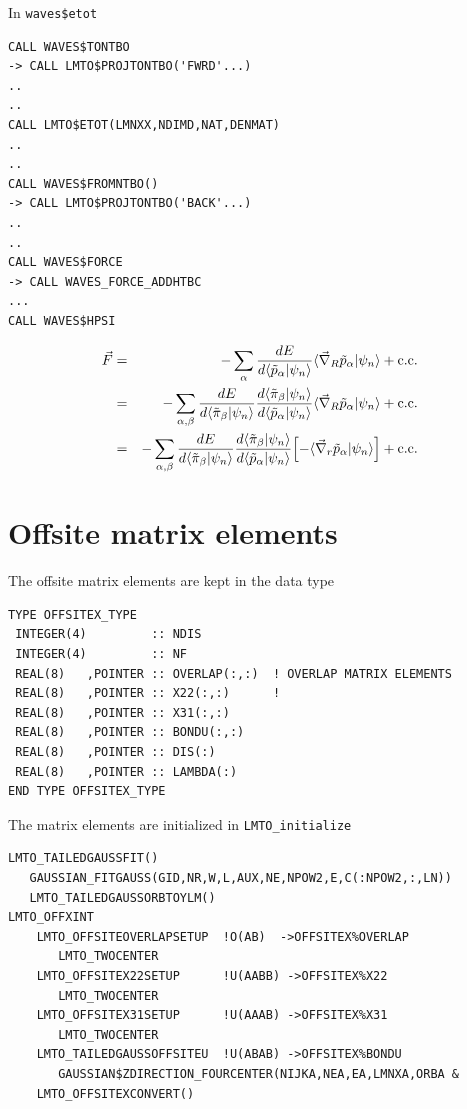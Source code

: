 \documentclass[11pt,a4paper]{report}
\begin{document}
In \verb|waves$etot|
\begin{verbatim}
CALL WAVES$TONTBO
-> CALL LMTO$PROJTONTBO('FWRD'...)
..
..
CALL LMTO$ETOT(LMNXX,NDIMD,NAT,DENMAT)
..
..
CALL WAVES$FROMNTBO()
-> CALL LMTO$PROJTONTBO('BACK'...)
..
..
CALL WAVES$FORCE
-> CALL WAVES_FORCE_ADDHTBC
...
CALL WAVES$HPSI
\end{verbatim}


\begin{eqnarray*}
\vec{F}&=&
-\sum_\alpha
\frac{dE}{d\langle\tilde{p}_\alpha|\psi_n\rangle}
\langle\vec{\nabla}_R\tilde{p}_\alpha|\psi_n\rangle
+\mathrm{c.c.}
\nonumber\\
&=&-\sum_{\alpha,\beta}
\frac{dE}{d\langle\tilde{\pi}_\beta|\psi_n\rangle}
\frac{d\langle\tilde{\pi}_\beta|\psi_n\rangle}
{d\langle\tilde{p}_\alpha|\psi_n\rangle}
\langle\vec{\nabla}_R\tilde{p}_\alpha|\psi_n\rangle
+\mathrm{c.c.}
\nonumber\\
&=&-\sum_{\alpha,\beta}
\frac{dE}{d\langle\tilde{\pi}_\beta|\psi_n\rangle}
\frac{d\langle\tilde{\pi}_\beta|\psi_n\rangle}
{d\langle\tilde{p}_\alpha|\psi_n\rangle}
\Bigl[-\langle\vec{\nabla}_r\tilde{p}_\alpha|\psi_n\rangle\Bigr]
+\mathrm{c.c.}
\end{eqnarray*}


\section{Offsite matrix elements}
The offsite matrix elements are kept in the data type 
\begin{verbatim}
TYPE OFFSITEX_TYPE
 INTEGER(4)         :: NDIS
 INTEGER(4)         :: NF
 REAL(8)   ,POINTER :: OVERLAP(:,:)  ! OVERLAP MATRIX ELEMENTS
 REAL(8)   ,POINTER :: X22(:,:)      !
 REAL(8)   ,POINTER :: X31(:,:)
 REAL(8)   ,POINTER :: BONDU(:,:)
 REAL(8)   ,POINTER :: DIS(:)
 REAL(8)   ,POINTER :: LAMBDA(:)
END TYPE OFFSITEX_TYPE
\end{verbatim}

The matrix elements are initialized in \verb|LMTO_initialize|
\begin{verbatim}
LMTO_TAILEDGAUSSFIT()
   GAUSSIAN_FITGAUSS(GID,NR,W,L,AUX,NE,NPOW2,E,C(:NPOW2,:,LN))
   LMTO_TAILEDGAUSSORBTOYLM()
LMTO_OFFXINT
    LMTO_OFFSITEOVERLAPSETUP  !O(AB)  ->OFFSITEX%OVERLAP
       LMTO_TWOCENTER
    LMTO_OFFSITEX22SETUP      !U(AABB) ->OFFSITEX%X22
       LMTO_TWOCENTER
    LMTO_OFFSITEX31SETUP      !U(AAAB) ->OFFSITEX%X31
       LMTO_TWOCENTER
    LMTO_TAILEDGAUSSOFFSITEU  !U(ABAB) ->OFFSITEX%BONDU
       GAUSSIAN$ZDIRECTION_FOURCENTER(NIJKA,NEA,EA,LMNXA,ORBA &
    LMTO_OFFSITEXCONVERT()
\end{verbatim}
\end{document}
